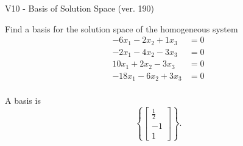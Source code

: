 \begin{exercise}
  \begin{exerciseTitle}V10 - Basis of Solution Space (ver. 190)\end{exerciseTitle}
  \begin{exerciseStatement}
    Find a basis for the solution space of the homogeneous system 
\begin{align*}
 -6 x_ 1 -2 x_ 2 + 1 x_ 3 &= 0  \\ 
  -2 x_ 1 -4 x_ 2 -3 x_ 3 &= 0  \\ 
  10 x_ 1 + 2 x_ 2 -3 x_ 3 &= 0  \\ 
  -18 x_ 1 -6 x_ 2 + 3 x_ 3 &= 0  \\ 
 \end{align*}


 
  \end{exerciseStatement}

  \begin{exerciseAnswer}
   A basis is   
\[\left\{\left[\begin{array}{c}
\frac{1}{2} \\
-1 \\
1
\end{array}\right]\right\}.\]

  


  \end{exerciseAnswer}
\end{exercise}